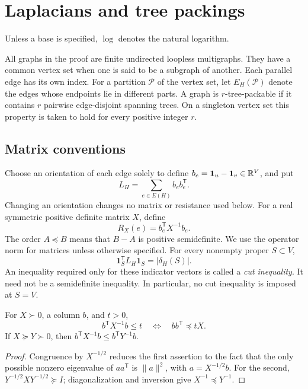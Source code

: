 \section{Laplacians and tree packings}\label{sec:preliminaries}

Unless a base is specified, $\log$ denotes the natural logarithm.

All graphs in the proof are finite undirected loopless multigraphs.
They have a common vertex set when one is said to be a subgraph of
another. Each parallel edge has its own index.
For a partition \(\mathcal P\) of the vertex set, let
\(E_H(\mathcal P)\) denote the edges whose endpoints lie in different
parts. A graph is \(r\)-tree-packable if it contains \(r\) pairwise
edge-disjoint spanning trees. On a singleton vertex set this property
is taken to hold for every positive integer \(r\).

\subsection{Matrix conventions}

Choose an orientation of each edge solely to define
\(b_e=\mathbf1_u-\mathbf1_v\in\mathbb R^V\), and put
\[
 L_H=\sum_{e\in E(H)}b_eb_e^{\mathsf T}.
\]
Changing an orientation changes no matrix or resistance used below.
For a real symmetric positive definite matrix \(X\), define
\[
 R_X(e)=b_e^{\mathsf T}X^{-1}b_e.
\]
The order \(A\preceq B\) means that \(B-A\) is positive semidefinite.
We use the operator norm for matrices unless otherwise specified.
For every nonempty proper \(S\subset V\),
\[
 \mathbf1_S^{\mathsf T}L_H\mathbf1_S=|\delta_H(S)|.
\]
An inequality required only for these indicator vectors is called a
\emph{cut inequality}. It need not be a semidefinite inequality.
In particular, no cut inequality is imposed at \(S=V\).

\begin{lemma}\label{lem:resistance-order}
For \(X\succ0\), a column \(b\), and \(t>0\),
\[
 b^{\mathsf T}X^{-1}b\le t
 \quad\Longleftrightarrow\quad
 bb^{\mathsf T}\preceq tX.
\]
If \(X\succeq Y\succ0\), then
\(b^{\mathsf T}X^{-1}b\le b^{\mathsf T}Y^{-1}b\).
\end{lemma}
\begin{proof}
Congruence by \(X^{-1/2}\) reduces the first assertion to the fact
that the only possible nonzero eigenvalue of \(aa^{\mathsf T}\) is
\(\|a\|^2\), with \(a=X^{-1/2}b\).
For the second, \(Y^{-1/2}XY^{-1/2}\succeq I\); diagonalization and
inversion give \(X^{-1}\preceq Y^{-1}\).
\end{proof}

